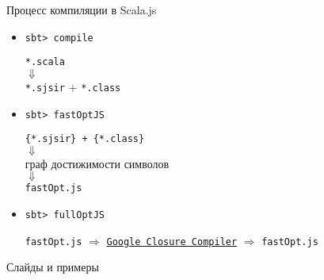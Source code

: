 \begin{frame}{Процесс компиляции в Scala.js}
	\begin{itemize}
		\item[] \alert{\texttt{sbt> compile}}
		\begin{center}
		\begin{small}
			\texttt{*.scala}\\ 
			$\Downarrow$ \\ 
			\texttt{*.sjsir} $+$ \texttt{*.class}
		\end{small}
		\end{center}
		\item[] \alert{\texttt{sbt> fastOptJS}}
		\begin{center}
		\begin{small}
			\texttt{\{*.sjsir\} + \{*.class\}}  \\ 
            $\Downarrow$ \\
            граф достижимости символов \\
            $\Downarrow$ \\
            \texttt{fastOpt.js}
        \end{small}
		\end{center}
		\item[] \alert{\texttt{sbt> fullOptJS}}
		\begin{center}
		\begin{small}
			\texttt{fastOpt.js} $\Rightarrow$ \texttt{\href{https://github.com/google/closure-compiler}{Google Closure Compiler}} $\Rightarrow$ \texttt{fastOpt.js}
        \end{small}
		\end{center}
	\end{itemize}
\end{frame}

\begin{frame}{Слайды и примеры}
\begin{center}
\end{center}
\end{frame}



